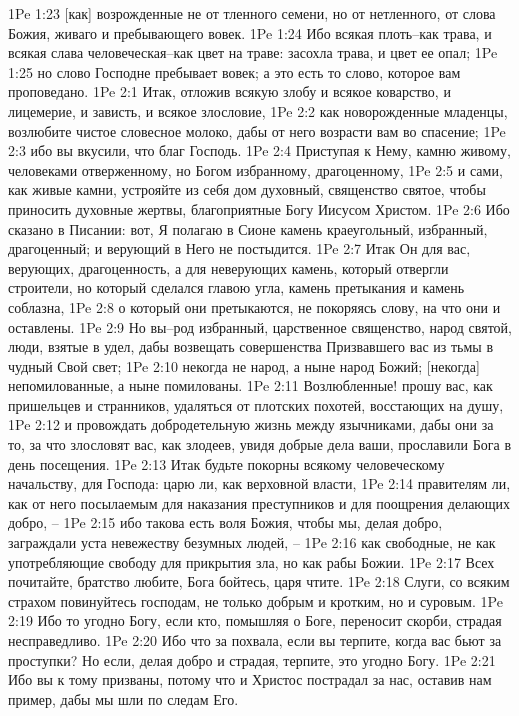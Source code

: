 1Pe 1:23  [как] возрожденные не от тленного семени, но от нетленного, от слова Божия, живаго и пребывающего вовек.
1Pe 1:24  Ибо всякая плоть--как трава, и всякая слава человеческая--как цвет на траве: засохла трава, и цвет ее опал;
1Pe 1:25  но слово Господне пребывает вовек; а это есть то слово, которое вам проповедано.
1Pe 2:1  Итак, отложив всякую злобу и всякое коварство, и лицемерие, и зависть, и всякое злословие,
1Pe 2:2  как новорожденные младенцы, возлюбите чистое словесное молоко, дабы от него возрасти вам во спасение;
1Pe 2:3  ибо вы вкусили, что благ Господь.
1Pe 2:4  Приступая к Нему, камню живому, человеками отверженному, но Богом избранному, драгоценному,
1Pe 2:5  и сами, как живые камни, устрояйте из себя дом духовный, священство святое, чтобы приносить духовные жертвы, благоприятные Богу Иисусом Христом.
1Pe 2:6  Ибо сказано в Писании: вот, Я полагаю в Сионе камень краеугольный, избранный, драгоценный; и верующий в Него не постыдится.
1Pe 2:7  Итак Он для вас, верующих, драгоценность, а для неверующих камень, который отвергли строители, но который сделался главою угла, камень претыкания и камень соблазна,
1Pe 2:8  о который они претыкаются, не покоряясь слову, на что они и оставлены.
1Pe 2:9  Но вы--род избранный, царственное священство, народ святой, люди, взятые в удел, дабы возвещать совершенства Призвавшего вас из тьмы в чудный Свой свет;
1Pe 2:10  некогда не народ, а ныне народ Божий; [некогда] непомилованные, а ныне помилованы.
1Pe 2:11  Возлюбленные! прошу вас, как пришельцев и странников, удаляться от плотских похотей, восстающих на душу,
1Pe 2:12  и провождать добродетельную жизнь между язычниками, дабы они за то, за что злословят вас, как злодеев, увидя добрые дела ваши, прославили Бога в день посещения.
1Pe 2:13  Итак будьте покорны всякому человеческому начальству, для Господа: царю ли, как верховной власти,
1Pe 2:14  правителям ли, как от него посылаемым для наказания преступников и для поощрения делающих добро, --
1Pe 2:15  ибо такова есть воля Божия, чтобы мы, делая добро, заграждали уста невежеству безумных людей, --
1Pe 2:16  как свободные, не как употребляющие свободу для прикрытия зла, но как рабы Божии.
1Pe 2:17  Всех почитайте, братство любите, Бога бойтесь, царя чтите.
1Pe 2:18  Слуги, со всяким страхом повинуйтесь господам, не только добрым и кротким, но и суровым.
1Pe 2:19  Ибо то угодно Богу, если кто, помышляя о Боге, переносит скорби, страдая несправедливо.
1Pe 2:20  Ибо что за похвала, если вы терпите, когда вас бьют за проступки? Но если, делая добро и страдая, терпите, это угодно Богу.
1Pe 2:21  Ибо вы к тому призваны, потому что и Христос пострадал за нас, оставив нам пример, дабы мы шли по следам Его.
